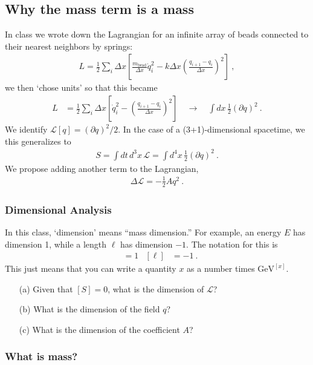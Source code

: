 \documentclass[12pt]{article}
\begin{document}
\subsection{Why the mass term is a mass}

In class we wrote down the Lagrangian for an infinite array of beads connected to their nearest neighbors by springs:
\begin{align}
	L = \frac 12 \sum_i \Delta x
	\left[
	\frac{m_\text{bead}}{\Delta x}
	{\dot q}_i^2 
	- 
	k\Delta x
	\left(\frac{q_{i+1}-q_i}{\Delta x}\right)^2 
	\right] \ ,
\end{align}
we then `chose units' so that this became
\begin{align}
	L &= \frac 12 \sum_i \Delta x
	\left[
	{\dot q}_i^2 - \left(\frac{q_{i+1}-q_i}{\Delta x}\right)^2 
	\right]  
	\quad\to\quad \int dx \, \frac{1}{2} (\partial q)^2 \ .
\end{align}
We identify $\mathcal L[q] = (\partial q)^2/2$.
In the case of a (3+1)-dimensional spacetime, we this generalizes to
\begin{align}
	S = \int dt \,d^3x\, \mathcal L = \int d^4x \, \frac 12 (\partial q)^2 \ .
\end{align}
We propose adding another term to the Lagrangian,
\begin{align}
	\Delta \mathcal L = - \frac 12 A q^2 \ .
\end{align}

\subsubsection{Dimensional Analysis}
In this class, `dimension' means ``mass dimension.'' For example, an energy $E$ has dimension 1, while a length $\mathcal\ell$ has dimension $-1$. The notation for this is
\begin{align}
	[E] &=1 & [\ell] &=-1 \ .
\end{align} 
This just means that you can write a quantity $x$ as a number times $\text{GeV}^{[x]}$. 

\begin{enumerate}
	\item[(a)] Given that $[S]=0$, what is the dimension of $\mathcal L$?
	\item[(b)] What is the dimension of the field $q$?
	\item[(c)] What is the dimension of the coefficient $A$?
\end{enumerate}

\subsubsection{What is mass?}
\end{document}
